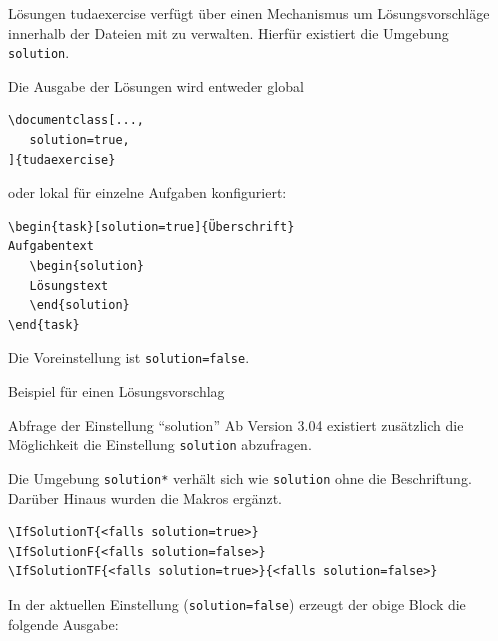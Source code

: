 \documentclass[
	ngerman,
	points=true,%
	]{tudaexercise}
\let\code\texttt
\begin{document}
\begin{task}[solution=true]{Lösungen}
tudaexercise verfügt über einen Mechanismus um Lösungsvorschläge innerhalb der Dateien mit zu verwalten. Hierfür existiert die Umgebung \code{solution}.

Die Ausgabe der Lösungen wird entweder global
\begin{verbatim}
\documentclass[...,
   solution=true,
]{tudaexercise}
\end{verbatim}
oder lokal für einzelne Aufgaben konfiguriert:

\begin{verbatim}
\begin{task}[solution=true]{Überschrift}
Aufgabentext
   \begin{solution}
   Lösungstext
   \end{solution}
\end{task}
\end{verbatim}
Die Voreinstellung ist \code{solution=false}.
\begin{solution}
Beispiel für einen Lösungsvorschlag
\end{solution}
\end{task}

\begin{task}{Abfrage der Einstellung \enquote{solution}}
Ab Version 3.04 existiert zusätzlich die Möglichkeit die Einstellung \code{solution} abzufragen.

Die Umgebung \code{solution*} verhält sich wie \code{solution} ohne die Beschriftung. Darüber Hinaus wurden die Makros \code{\IfSolutionTF} ergänzt.

\begin{verbatim}
\IfSolutionT{<falls solution=true>}
\IfSolutionF{<falls solution=false>}
\IfSolutionTF{<falls solution=true>}{<falls solution=false>}
\end{verbatim}

In der aktuellen Einstellung (\code{solution=false}) erzeugt der obige Block die folgende Ausgabe:


\end{task}
\end{document}
